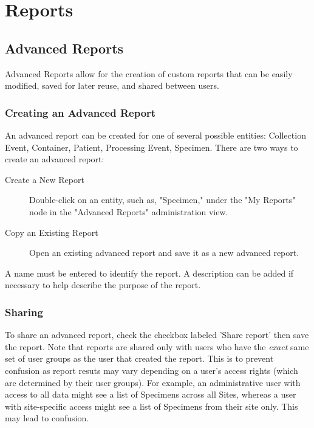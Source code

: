 \chapter{Reports}
\label{chap:reports}

\section{Advanced Reports}

Advanced Reports allow for the creation of custom reports that can be easily modified, saved for later reuse, and shared between users.

\subsection{Creating an Advanced Report}

An advanced report can be created for one of several possible entities: Collection Event, Container, Patient, Processing Event, Specimen. There are two ways to create an advanced report:

\begin{description}
\item[Create a New Report] Double-click on an entity, such as, "Specimen," under the "My Reports" node in the "Advanced Reports" administration view.
\item[Copy an Existing Report] Open an existing advanced report and save it as a new advanced report.
\end{description}

A name must be entered to identify the report. A description can be added if necessary to help describe the purpose of the report.

\subsection{Sharing}

To share an advanced report, check the checkbox labeled 'Share report' then save the report. Note that reports are shared only with users who have the \emph{exact} same set of user groups as the user that created the report. This is to prevent confusion as report resuts may vary depending on a user's access rights (which are determined by their user groups). For example, an administrative user with access to all data might see a list of Specimens across all Sites, whereas a user with site-specific access might see a list of Specimens from their site only. This may lead to confusion.

